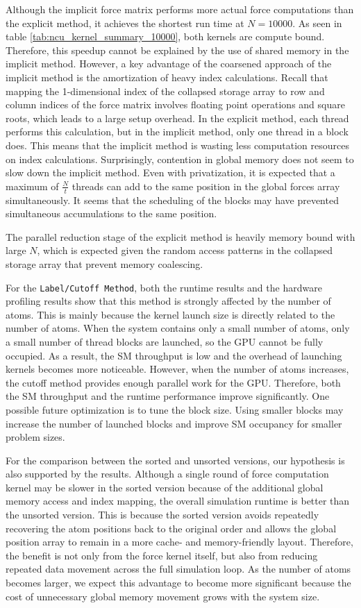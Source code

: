 \documentclass[12pt]{article}
\begin{document}
Although the implicit force matrix performs more actual force computations than the explicit method, it achieves the shortest run time at $N=10000$. As seen in table \ref{tab:ncu_kernel_summary_10000}, both kernels are compute bound. Therefore, this speedup cannot be explained by the use of shared memory in the implicit method. However, a key advantage of the coarsened approach of the implicit method is the amortization of heavy index calculations. Recall that mapping the 1-dimensional index of the collapsed storage array to row and column indices of the force matrix involves floating point operations and square roots, which leads to a large setup overhead. In the explicit method, each thread performs this calculation, but in the implicit method, only one thread in a block does. This means that the implicit method is wasting less computation resources on index calculations. Surprisingly, contention in global memory does not seem to slow down the implicit method. Even with privatization, it is expected that a maximum of $\frac{N}{t}$ threads can add to the same position in the global forces array simultaneously. It seems that the scheduling of the blocks may have prevented simultaneous accumulations to the same position. 

The parallel reduction stage of the explicit method is heavily memory bound with large $N$, which is expected given the random access patterns in the collapsed storage array that prevent memory coalescing. 

For the \texttt{Label/Cutoff Method}, both the runtime results and the hardware profiling results show that this method is strongly affected by the number of atoms. This is mainly because the kernel launch size is directly related to the number of atoms. When the system contains only a small number of atoms, only a small number of thread blocks are launched, so the GPU cannot be fully occupied. As a result, the SM throughput is low and the overhead of launching kernels becomes more noticeable. However, when the number of atoms increases, the cutoff method provides enough parallel work for the GPU. Therefore, both the SM throughput and the runtime performance improve significantly. One possible future optimization is to tune the block size. Using smaller blocks may increase the number of launched blocks and improve SM occupancy for smaller problem sizes.

For the comparison between the sorted and unsorted versions, our hypothesis is also supported by the results. Although a single round of force computation kernel may be slower in the sorted version because of the additional global memory access and index mapping, the overall simulation runtime is better than the unsorted version. This is because the sorted version avoids repeatedly recovering the atom positions back to the original order and allows the global position array to remain in a more cache- and memory-friendly layout. Therefore, the benefit is not only from the force kernel itself, but also from reducing repeated data movement across the full simulation loop. As the number of atoms becomes larger, we expect this advantage to become more significant because the cost of unnecessary global memory movement grows with the system size.
\end{document}

